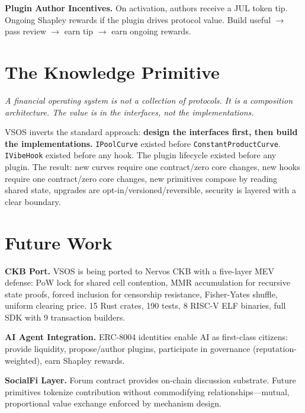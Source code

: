 \documentclass[9pt, letterpaper]{article}
\begin{document}
\textbf{Plugin Author Incentives.} On activation, authors receive a JUL token tip. Ongoing Shapley rewards if the plugin drives protocol value. Build useful $\to$ pass review $\to$ earn tip $\to$ earn ongoing rewards.


\section{The Knowledge Primitive}

\textit{A financial operating system is not a collection of protocols. It is a composition architecture. The value is in the interfaces, not the implementations.}

VSOS inverts the standard approach: \textbf{design the interfaces first, then build the implementations.} \texttt{IPoolCurve} existed before \texttt{ConstantProductCurve}. \texttt{IVibeHook} existed before any hook. The plugin lifecycle existed before any plugin. The result: new curves require one contract/zero core changes, new hooks require one contract/zero core changes, new primitives compose by reading shared state, upgrades are opt-in/versioned/reversible, security is layered with a clear boundary.


\section{Future Work}

\textbf{CKB Port.} VSOS is being ported to Nervos CKB with a five-layer MEV defense: PoW lock for shared cell contention, MMR accumulation for recursive state proofs, forced inclusion for censorship resistance, Fisher-Yates shuffle, uniform clearing price. 15 Rust crates, 190 tests, 8 RISC-V ELF binaries, full SDK with 9 transaction builders.

\textbf{AI Agent Integration.} ERC-8004 identities enable AI as first-class citizens: provide liquidity, propose/author plugins, participate in governance (reputation-weighted), earn Shapley rewards.

\textbf{SocialFi Layer.} Forum contract provides on-chain discussion substrate. Future primitives tokenize contribution without commodifying relationships---mutual, proportional value exchange enforced by mechanism design.
\end{document}
